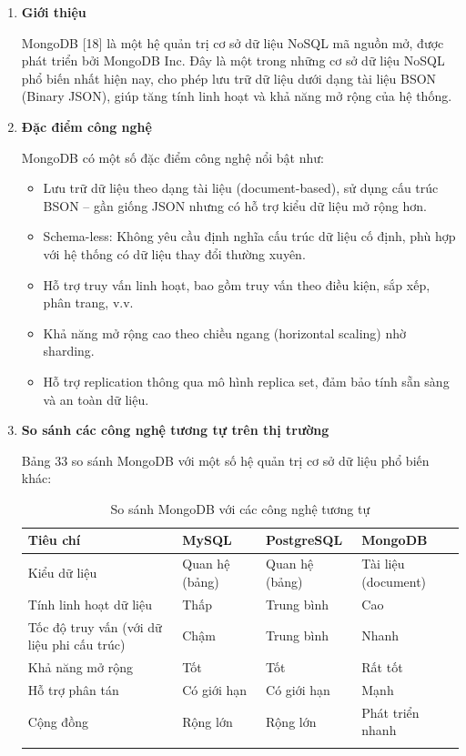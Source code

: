 \renewcommand{\labelenumi}{\alph{enumi})}
\begin{enumerate}
	\item \textbf{Giới thiệu}
	
	MongoDB [18] là một hệ quản trị cơ sở dữ liệu NoSQL mã nguồn mở, được phát triển bởi MongoDB Inc. Đây là một trong những cơ sở dữ liệu NoSQL phổ biến nhất hiện nay, cho phép lưu trữ dữ liệu dưới dạng tài liệu BSON (Binary JSON), giúp tăng tính linh hoạt và khả năng mở rộng của hệ thống.
	
	\item \textbf{Đặc điểm công nghệ}
	
	MongoDB có một số đặc điểm công nghệ nổi bật như:
	\begin{itemize}
		\item Lưu trữ dữ liệu theo dạng tài liệu (document-based), sử dụng cấu trúc BSON – gần giống JSON nhưng có hỗ trợ kiểu dữ liệu mở rộng hơn.
		\item Schema-less: Không yêu cầu định nghĩa cấu trúc dữ liệu cố định, phù hợp với hệ thống có dữ liệu thay đổi thường xuyên.
		\item Hỗ trợ truy vấn linh hoạt, bao gồm truy vấn theo điều kiện, sắp xếp, phân trang, v.v.
		\item Khả năng mở rộng cao theo chiều ngang (horizontal scaling) nhờ sharding.
		\item Hỗ trợ replication thông qua mô hình replica set, đảm bảo tính sẵn sàng và an toàn dữ liệu.
	\end{itemize}
	
	\item \textbf{So sánh các công nghệ tương tự trên thị trường}
	
	Bảng 33 so sánh MongoDB với một số hệ quản trị cơ sở dữ liệu phổ biến khác:
	
	\begin{longtable}{|>{\raggedright\arraybackslash}m{4cm}|>{\centering\arraybackslash}m{2.5cm}|>{\centering\arraybackslash}m{2.5cm}|>{\centering\arraybackslash}m{2.5cm}|}
		\hline
		\textbf{Tiêu chí} & \textbf{MySQL} & \textbf{PostgreSQL} & \textbf{MongoDB} \\
		\hline
		Kiểu dữ liệu & Quan hệ (bảng) & Quan hệ (bảng) & Tài liệu (document) \\
		\hline
		Tính linh hoạt dữ liệu & Thấp & Trung bình & Cao \\
		\hline
		Tốc độ truy vấn (với dữ liệu phi cấu trúc) & Chậm & Trung bình & Nhanh \\
		\hline
		Khả năng mở rộng & Tốt & Tốt & Rất tốt \\
		\hline
		Hỗ trợ phân tán & Có giới hạn & Có giới hạn & Mạnh \\
		\hline
		Cộng đồng & Rộng lớn & Rộng lớn & Phát triển nhanh \\
		\hline
		\caption{So sánh MongoDB với các công nghệ tương tự}
	\end{longtable}
	

\end{enumerate}
